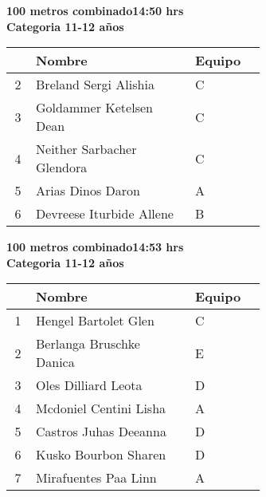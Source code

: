 \begin{minipage}{0.95\linewidth}\vspace{0.5cm} 
\begin{flushleft}
\textbf{
\hspace{-0.15cm}100 metros combinado\hspace{1.5cm}14:50 hrs \\Categoria 11-12 años}\vspace{-0.2cm} 
\end{flushleft}
\begin{tabular}{cp{0.63\linewidth}l}
\hline
& \textbf{Nombre} & \textbf{Equipo} \\ \hline
2 & Breland Sergi Alishia & C \\ 
3 & Goldammer Ketelsen Dean & C \\ 
4 & Neither Sarbacher Glendora & C \\ 
5 & Arias Dinos Daron & A \\ 
6 & Devreese Iturbide Allene & B \\ 
\end{tabular}
\end{minipage}
\begin{minipage}{0.95\linewidth}\vspace{0.5cm} 
\begin{flushleft}
\textbf{
\hspace{-0.15cm}100 metros combinado\hspace{1.5cm}14:53 hrs \\Categoria 11-12 años}\vspace{-0.2cm} 
\end{flushleft}
\begin{tabular}{cp{0.63\linewidth}l}
\hline
& \textbf{Nombre} & \textbf{Equipo} \\ \hline
1 & Hengel Bartolet Glen & C \\ 
2 & Berlanga Bruschke Danica & E \\ 
3 & Oles Dilliard Leota & D \\ 
4 & Mcdoniel Centini Lisha & A \\ 
5 & Castros Juhas Deeanna & D \\ 
6 & Kusko Bourbon Sharen & D \\ 
7 & Mirafuentes Paa Linn & A \\ 
\end{tabular}
\end{minipage}
